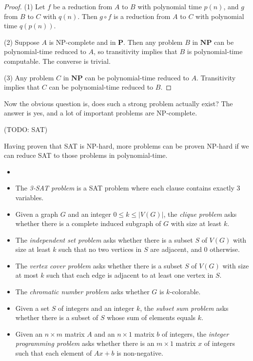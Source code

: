         \begin{proof}
            (1) Let $f$ be a reduction from $A$ to $B$ with polynomial time $p(n)$, and $g$ from $B$ to $C$ with $q(n)$. Then $g \circ f$ is a reduction from $A$ to $C$ with polynomial time $q(p(n))$.
            
            (2) Suppose $A$ is NP-complete and in $\mathbf{P}$. Then any problem $B$ in $\mathbf{NP}$ can be polynomial-time reduced to $A$, so transitivity implies that $B$ is polynomial-time computable. The converse is trivial.
            
            (3) Any problem $C$ in $\mathbf{NP}$ can be polynomial-time reduced to $A$. Transitivity implies that $C$ can be polynomial-time reduced to $B$.
        \end{proof}
        
        Now the obvious question is, does such a strong problem actually exist? The answer is yes, and a lot of important problems are NP-complete.
        
        (TODO: SAT)
        
        Having proven that SAT is NP-hard, more problems can be proven NP-hard if we can reduce SAT to those problems in polynomial-time.
        
        \begin{defn} \label{def_npc_examples} \begin{itemize}
            \item[]
            \item The \emph{3-SAT problem} is a SAT problem where each clause contains exactly 3 variables.
            \item Given a graph $G$ and an integer $0 \leq k \leq |V(G)|$, the \emph{clique problem} asks whether there is a complete induced subgraph of $G$ with size at least $k$.
            \item The \emph{independent set problem} asks whether there is a subset $S$ of $V(G)$ with size at least $k$ such that no two vertices in $S$ are adjacent, and 0 otherwise.
            \item The \emph{vertex cover problem} asks whether there is a subset $S$ of $V(G)$ with size at most $k$ such that each edge is adjacent to at least one vertex in $S$.
            \item The \emph{chromatic number problem} asks whether $G$ is $k$-colorable.
            \item Given a set $S$ of integers and an integer $k$, the \emph{subset sum problem} asks whether there is a subset of $S$ whose sum of elements equals $k$.
            \item Given an $n \times m$ matrix $A$ and an $n \times 1$ matrix $b$ of integers, the \emph{integer programming problem} asks whether there is an $m \times 1$ matrix $x$ of integers such that each element of $Ax+b$ is non-negative.
        \end{itemize}
        \end{defn}
